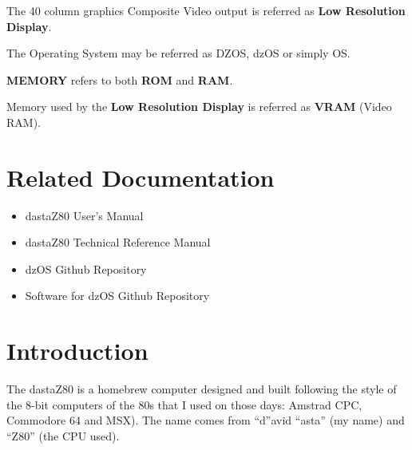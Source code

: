 \documentclass[a4paper,11pt]{article}
\begin{document}
    The 40 column graphics Composite Video output is referred as \textbf{Low
    Resolution Display}.
    
    The Operating System may be referred as DZOS, dzOS or simply OS.

    \textbf{MEMORY} refers to both \textbf{ROM} and \textbf{RAM}.

    Memory used by the \textbf{Low Resolution Display} is referred as
    \textbf{VRAM} (Video RAM).
    
    \pagebreak
    \section*{Related Documentation}
    \begin{itemize}
        \item dastaZ80 User's Manual\cite{dastaz80userman}
        \item dastaZ80 Technical Reference Manual\cite{dastaz80techman}
        \item dzOS Github Repository\cite{dastaZ80github}
        \item Software for dzOS Github Repository\cite{dastaZ80githubsoft}
    \end{itemize}

    \pagebreak
    \tableofcontents

    \pagebreak
    \pagestyle{fancy}
    \fancyhf{}
    \fancyfoot[R]{\thepage}
    \setcounter{page}{1}
    \section{Introduction}
    The dastaZ80 is a homebrew computer designed and built following the style
    of the 8-bit computers of the 80s that I used on those days: Amstrad CPC,
    Commodore 64 and MSX). The name comes from “d”avid “asta” (my name) and 
    “Z80” (the CPU used).
\end{document}

